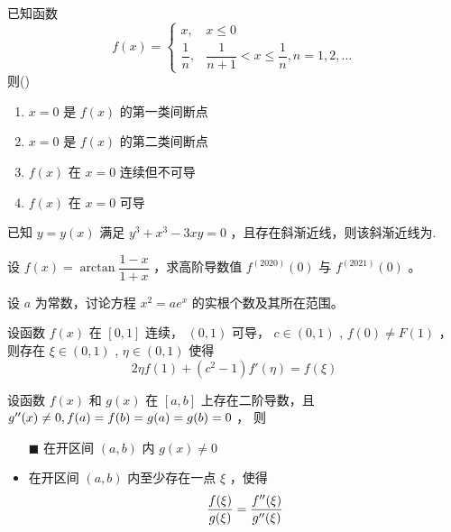 \begin{quest}[C2T8]
    已知函数$$
    f(x) = \begin{cases}
        x,&x\leq 0\\
        \dfrac{1}{n},&\dfrac{1}{n+1}<x\leq \dfrac{1}{n}, n = 1,2,\dots
    \end{cases}
$$ 则()
\begin{enumerate}
    \item $ x=0 $ 是 $ f(x) $ 的第一类间断点
    \item $ x=0 $ 是 $ f(x) $ 的第二类间断点
    \item $ f(x) $ 在 $ x=0 $ 连续但不可导
    \item $ f(x) $ 在 $ x=0 $ 可导
\end{enumerate}
\end{quest}

\begin{quest}[C2T11]
    已知 $ y = y(x) $ 满足 $ y^3+x^3-3xy = 0 $ ，且存在斜渐近线，则该斜渐近线为\qline.
\end{quest}

\begin{quest}[C2T17]
    设 $ f(x) = \arctan \dfrac{1-x}{1+x} $ ，求高阶导数值 $ f^{(2020)}(0) $ 与 $ f^{(2021)}(0) $ 。
\end{quest}

\begin{quest}[C2T20]
    设 $ a $ 为常数，讨论方程 $ x^2=ae^x $ 的实根个数及其所在范围。
\end{quest}


\begin{quest}[C2T21]
    设函数 $ f(x) $ 在 $ [0,1] $ 连续， $ (0,1) $ 可导， $ c\in (0,1) $ , $ f(0)\neq F(1) $ ，
    则存在 $ \xi\in (0,1) $ , $ \eta\in (0,1) $ 使得 $$
        2\eta f(1) + (c^2-1)f'(\eta) = f(\xi)
    $$ 
\end{quest}

\begin{quest}[C2T22]
    设函数 $ f(x) $ 和 $ g(x) $ 在 $ [a,b] $ 上存在二阶导数，且 $ g^{\prime\prime}(x)\neq 0, f(a)=f(b)=g(a)=g(b) = 0 $ ，
    则\begin{itemize}
        \item[$ \blacksquare $ ] 在开区间 $ (a,b) $ 内 $ g(x)\neq 0 $ 
        \item 在开区间 $ (a,b) $ 内至少存在一点 $ \xi $ ，使得$$
            \dfrac{f(\xi)}{g(\xi)} = \dfrac{f^{\prime\prime}(\xi)}{g^{\prime\prime}(\xi)}
        $$ 
    \end{itemize}
\end{quest}

